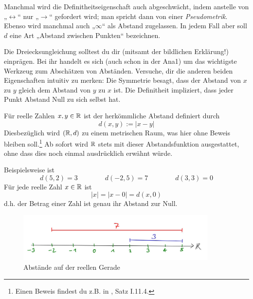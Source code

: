 \begin{bem}
    Manchmal wird die Definitheitseigenschaft auch abgeschwächt, indem anstelle von „$\leftrightarrow$“ nur „$\rightarrow$“ gefordert wird; man spricht dann von einer \emph{Pseudometrik}. Ebenso wird manchmal auch „$\infty$“ als Abstand zugelassen. In jedem Fall aber soll $d$ eine Art „Abstand zwischen Punkten“ bezeichnen.
    
    Die Dreiecksungleichung solltest du dir (mitsamt der bildlichen Erklärung!) einprägen. Bei ihr handelt es sich (auch schon in der Ana1) um das wichtigste Werkzeug zum Abschätzen von Abständen. Versuche, dir die anderen beiden Eigenschaften intuitiv zu merken: Die Symmetrie besagt, dass der Abstand von $x$ zu $y$ gleich dem Abstand von $y$ zu $x$ ist. Die Definitheit impliziert, dass jeder Punkt Abstand Null zu sich selbst hat.
\end{bem}


\begin{de}[Abstand in $\R$]
    Für reelle Zahlen $x,y\in \mathbb R$ ist der herkömmliche Abstand definiert durch
        \[ d(x,y) := \vert x -y\vert \]
    Diesbezüglich wird $(\mathbb R,d)$ zu einem metrischen Raum, was hier ohne Beweis bleiben soll.\footnote{Einen Beweis findest du z.B. in \cite{AE06}, Satz I.11.4.} Ab sofort wird $\R$ stets mit dieser Abstandsfunktion ausgestattet, ohne dass dies noch einmal ausdrücklich erwähnt würde.
\end{de}


\begin{bsp}
    Beispielsweise ist
        \[ d(5,2)= 3 \qquad\qquad d(-2,5)=7 \qquad\qquad d(3,3)=0 \]
    Für jede reelle Zahl $x\in \mathbb R$ ist
        \[ \vert x\vert = \vert x-0\vert = d(x,0) \]
    d.h. der Betrag einer Zahl ist genau ihr Abstand zur Null. 
    \begin{figure}[ht]
        \includegraphics[width=10cm]{./_img/Abstand.jpeg}
        \centering \caption{Abstände auf der reellen Gerade}
    \end{figure}
\end{bsp}


